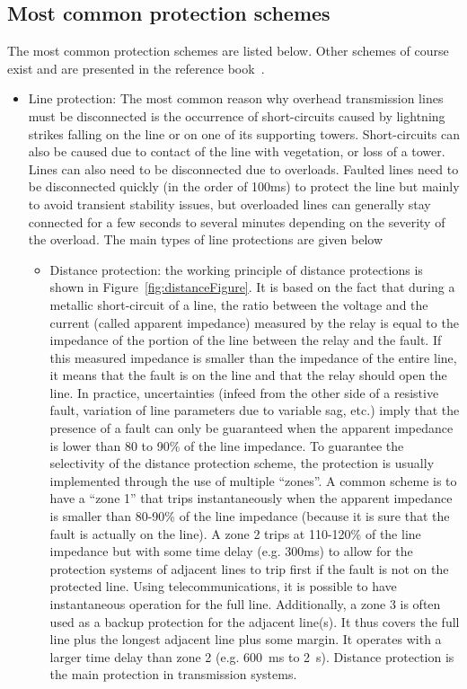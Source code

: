 \subsection{Most common protection schemes}

The most common protection schemes are listed below. Other schemes of course exist and are presented in the reference book~\cite{HorowitzBook}.

\begin{itemize}
    \item Line protection: The most common reason why overhead transmission lines must be disconnected is the occurrence of short-circuits caused by lightning strikes falling on the line or on one of its supporting towers. Short-circuits can also be caused due to contact of the line with vegetation, or loss of a tower. Lines can also need to be disconnected due to overloads. Faulted lines need to be disconnected quickly (in the order of 100ms) to protect the line but mainly to avoid transient stability issues, but overloaded lines can generally stay connected for a few seconds to several minutes depending on the severity of the overload. The main types of line protections are given below
    \begin{itemize}
        \item Distance protection: the working principle of distance protections is shown in Figure~\ref{fig:distanceFigure}. It is based on the fact that during a metallic short-circuit of a line, the ratio between the voltage and the current (called apparent impedance) measured by the relay is equal to the impedance of the portion of the line between the relay and the fault. If this measured impedance is smaller than the impedance of the entire line, it means that the fault is on the line and that the relay should open the line. In practice, uncertainties (infeed from the other side of a resistive fault, variation of line parameters due to variable sag, etc.) imply that the presence of a fault can only be guaranteed when the apparent impedance is lower than 80 to 90\% of the line impedance. To guarantee the selectivity of the distance protection scheme, the protection is usually implemented through the use of multiple ``zones''. A common scheme is to have a ``zone 1'' that trips instantaneously when the apparent impedance is smaller than 80-90\% of the line impedance (because it is sure that the fault is actually on the line). A zone 2 trips at 110-120\% of the line impedance but with some time delay (e.g. 300ms) to allow for the protection systems of adjacent lines to trip first if the fault is not on the protected line. Using telecommunications, it is possible to have instantaneous operation for the full line. Additionally, a zone 3 is often used as a backup protection for the adjacent line(s). It thus covers the full line plus the longest adjacent line plus some margin. It operates with a larger time delay than zone 2 (e.g. 600~ms to 2~s). Distance protection is the main protection in transmission systems.

\end{itemize}
\end{itemize}
